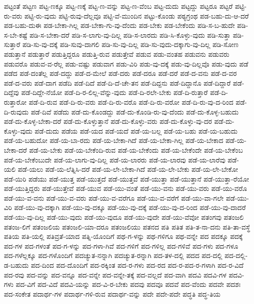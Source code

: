 {ಪಟ್ಟಂತೆ
ಪಟ್ಟಣ
ಪಟ್ಟ-ಣಕ್ಕೂ
ಪಟ್ಟ-ಣಕ್ಕೆ
ಪಟ್ಟ-ಣ-ವನ್ನು
ಪಟ್ಟ-ಣ-ವೆಂಬ
ಪಟ್ಟ-ದುದು
ಪಟ್ಟದ್ದು
ಪಟ್ಟರೂ
ಪಟ್ಟರೆ
ಪಟ್ಟಿ-ರು-ವರು
ಪಟ್ಟಿ-ರು-ವುದು
ಪಟ್ಟಿ-ರುವು-ದೆಲ್ಲವೂ
ಪಟ್ಟಿ-ವೆ-ಮುಂದಿನ
ಪಟ್ಟು-ಕೊಂಡು
ಪಠ್ಯಗ್ರಂಥ
ಪಡ-ಬಹು-ದು-ಆ-ದರೆ
ಪಡ-ಬಹು-ದುಈ
ಪಡ-ಬೇಕಾ-ಗಿಲ್ಲ
ಪಡ-ಬೇಕಾ-ಗು-ವು-ದೆಂದು
ಪಡ-ಬೇಕು
ಪಡ-ಬೇಕೆಂದು
ಪಡಿ-ಸ-ಬ-ಹುದೇ
ಪಡಿ-ಸ-ಬೇ-ಕಷ್ಟೆ
ಪಡಿ-ಸ-ಬೇಕಾ-ದರೆ
ಪಡಿ-ಸ-ಲಾಗು-ವು-ದಿಲ್ಲ
ಪಡಿ-ಸ-ಲಾರದು
ಪಡಿ-ಸಿ-ಕೊಳ್ಳು-ವುದು
ಪಡಿ-ಸುತ್ತಾ
ಪಡಿ-ಸುತ್ತಾರೆ
ಪಡಿ-ಸು-ವು-ದಕ್ಕೆ
ಪಡಿ-ಸುವು-ದಾಗಲಿ
ಪಡಿ-ಸು-ವು-ದಿಲ್ಲ
ಪಡಿ-ಸು-ವುದು-ದಕ್ಕಾಗು-ವು-ದಿಲ್ಲ
ಪಡಿ-ಸೋಣ
ಪಡುತ್ತಾನೆ
ಪಡುತ್ತಾರೆ
ಪಡುತ್ತಿದ್ದರೂ
ಪಡುತ್ತಿ-ರುವ
ಪಡುತ್ತೇವೆ
ಪಡುವ
ಪಡು-ವಂತಹ
ಪಡುವನು
ಪಡುವರು
ಪಡುವರೊ
ಪಡುವ-ವ-ರೆಲ್ಲ
ಪಡು-ವಷ್ಟು
ಪಡುವಾಗ
ಪಡು-ವಿರಿ
ಪಡು-ವು-ದಕ್ಕೆ
ಪಡು-ವು-ದಿಲ್ಲವೊ
ಪಡು-ವುದು
ಪಡೆ
ಪಡೆದ
ಪಡೆ-ದಂತೆಲ್ಲ
ಪಡೆ-ದದ್ದು
ಪಡೆ-ದ-ಮೇಲೆ
ಪಡೆ-ದರು
ಪಡೆ-ದರೂ
ಪಡೆ-ದರೆ
ಪಡೆ-ದ-ವನು
ಪಡೆ-ದ-ವರ
ಪಡೆ-ದ-ವರು
ಪಡೆ-ದಾಗ
ಪಡೆದಿ
ಪಡೆ-ದಿದೆ
ಪಡೆ-ದಿ-ದೆ-ಚೇ-ತನ
ಪಡೆ-ದಿದ್ದನು
ಪಡೆ-ದಿದ್ದಾನೊ
ಪಡೆ-ದಿದ್ದಾರೆ
ಪಡೆ-ದಿದ್ದೆವು
ಪಡೆ-ದಿದ್ದೇ-ನೆಯೋ
ಪಡೆ-ದಿ-ರ-ಲಿಲ್ಲ-ವೆನ್ನು-ವುದು
ಪಡೆ-ದಿ-ರಲೇ-ಬೇಕು
ಪಡೆ-ದಿ-ರುತ್ತಾರೆ
ಪಡೆ-ದಿ-ರುತ್ತಾರೋ
ಪಡೆ-ದಿ-ರುವ
ಪಡೆ-ದಿ-ರು-ವರು
ಪಡೆ-ದಿ-ರು-ವರೊ
ಪಡೆ-ದಿ-ರು-ವರೋ
ಪಡೆ-ದಿ-ರು-ವು-ದ-ರಿಂದ
ಪಡೆ-ದಿ-ರುವುದು
ಪಡೆ-ದಿವೆ
ಪಡೆದು
ಪಡೆ-ದು-ಕೊಂಡದ್ದು
ಪಡೆ-ದು-ಕೊಂಡಿ-ರು-ವು-ದೆಂದು
ಪಡೆ-ದು-ಕೊಳ್ಳ-ಬಹುದು
ಪಡೆ-ದು-ಕೊಳ್ಳ-ಬೇಕಾ-ದರೆ
ಪಡೆ-ದು-ಕೊಳ್ಳುತ್ತಾನೆ
ಪಡೆ-ದು-ಕೊಳ್ಳು-ವರು
ಪಡೆ-ದು-ಕೊಳ್ಳು-ವು-ದರ
ಪಡೆ-ದು-ಕೊಳ್ಳು-ವುದು
ಪಡೆ-ದುದು
ಪಡೆಯ
ಪಡೆ-ಯದ
ಪಡೆ-ಯದೆ
ಪಡೆ-ಯ-ಬಲ್ಲ
ಪಡೆ-ಯ-ಬಹು
ಪಡೆ-ಯ-ಬಹುದು
ಪಡೆ-ಯ-ಬಹುದೋ
ಪಡೆ-ಯ-ಬಾ-ರದು
ಪಡೆ-ಯ-ಬೇಕಾ-ಗಿದೆ
ಪಡೆ-ಯ-ಬೇಕಾ-ಗಿಲ್ಲ
ಪಡೆ-ಯ-ಬೇಕಾದ
ಪಡೆ-ಯ-ಬೇಕಾ-ದರೆ
ಪಡೆ-ಯ-ಬೇಕು
ಪಡೆ-ಯ-ಬೇಕೆಂದಿ-ರುವ
ಪಡೆ-ಯ-ಬೇಕೆಂದು
ಪಡೆ-ಯ-ಬೇಕೆಂದೇ
ಪಡೆ-ಯ-ಬೇಕೆಂಬ
ಪಡೆ-ಯ-ಬೇಕೆಂಬುದೇ
ಪಡೆ-ಯ-ಲಾಗು-ವು-ದಿಲ್ಲ
ಪಡೆ-ಯ-ಲಾರರು
ಪಡೆ-ಯ-ಲಾರವು
ಪಡೆ-ಯ-ಲಾರೆವು
ಪಡೆ-ಯಲಿ
ಪಡೆ-ಯಲು
ಪಡೆ-ಯ-ಲೆತ್ನಿಸಿ-ದರೆ
ಪಡೆ-ಯ-ಲೇ-ಬೇಕಾ-ಗಿದೆ
ಪಡೆ-ಯ-ಲೇ-ಬೇಕು
ಪಡೆ-ಯ-ಲೇ-ಬೇಕೋ
ಪಡೆ-ಯಿರಿ
ಪಡೆಯು
ಪಡೆ-ಯುತ್ತ
ಪಡೆ-ಯುತ್ತದೆ
ಪಡೆ-ಯುತ್ತವೆ
ಪಡೆ-ಯುತ್ತಾ
ಪಡೆ-ಯುತ್ತಾನೆ
ಪಡೆ-ಯುತ್ತಾ-ರೆಯೋ
ಪಡೆ-ಯುತ್ತಿದ್ದರು
ಪಡೆ-ಯುತ್ತೇವೆ
ಪಡೆ-ಯುವ
ಪಡೆ-ಯು-ವಂತೆ
ಪಡೆ-ಯು-ವನು
ಪಡೆ-ಯು-ವರು
ಪಡೆ-ಯು-ವರೊ
ಪಡೆ-ಯು-ವ-ವನು
ಪಡೆ-ಯು-ವ-ವರು
ಪಡೆ-ಯು-ವ-ವರೆಗೂ
ಪಡೆ-ಯು-ವ-ವರೆಗೆ
ಪಡೆ-ಯು-ವಾ-ಗಲೇ
ಪಡೆ-ಯು-ವಿರಿ
ಪಡೆ-ಯು-ವು-ದಕ್ಕಾಗಿ
ಪಡೆ-ಯು-ವು-ದಕ್ಕೂ
ಪಡೆ-ಯು-ವು-ದಕ್ಕೆ
ಪಡೆ-ಯು-ವು-ದ-ರಿಂದ
ಪಡೆ-ಯು-ವು-ದಾದರೆ
ಪಡೆ-ಯು-ವು-ದಿಲ್ಲ
ಪಡೆ-ಯು-ವುದು
ಪಡೆ-ಯು-ವುದೂ
ಪಡೆ-ಯು-ವುದೇ
ಪಡೆ-ಯು-ವೆವೋ
ಪತಂಗವು
ಪತಂಜಲಿ
ಪತಂಜ-ಲಿಗೆ
ಪತಂಜಲಿಯ
ಪತಂಜಲಿ-ಯಾ-ದರೂ
ಪತಂಜಲಿಯು
ಪತನದ
ಪತಿ
ಪತಿತ
ಪತಿ-ತ-ನಾ-ದನು
ಪತಿ-ತಾ-ವಸ್ಥೆ
ಪತಿಯ
ಪತಿ-ಯಲ್ಲಿ
ಪತಿವ್ರತೆ-ಯಾದ
ಪತ್ನಿ-ಯೊಂದಿಗೆ
ಪಥ-ಗ-ಳನ್ನು
ಪಥ-ಗಳಿಗೂ
ಪಥ-ವನ್ನೇ
ಪದ
ಪದಕ್ಕೂ
ಪದಕ್ಕೆ
ಪದ-ಗಳ
ಪದ-ಗಳಂತೆ
ಪದ-ಗ-ಳನ್ನು
ಪದ-ಗಳಾ-ಗಿವೆ
ಪದ-ಗಳಿಗೆ
ಪದ-ಗಳಿಲ್ಲ
ಪದ-ಗಳಿವೆ
ಪದ-ಗಳು
ಪದ-ಗಳೂ
ಪದ-ಗಳೆಲ್ಲಕ್ಕೂ
ಪದ-ಗಳೊಂದಿಗೆ
ಪದಚ್ಯುತ-ನನ್ನಾಗಿ
ಪದಚ್ಯುತ-ರನ್ನಾಗಿ
ಪದ-ತಳ-ದಲ್ಲಿ
ಪದದ
ಪದ-ದಲ್ಲಿ
ಪದ-ದಲ್ಲಿ-ಡ-ಬಹುದು
ಪದ-ದಿಂದ
ಪದ-ದೊಂದಿಗೆ
ಪದ-ರಕ್ಕಿಂತ
ಪದ-ರ-ಗಳು
ಪದ-ರದ
ಪದ-ರ-ಪದ-ರ-ಗಳಾಗಿ
ಪದ-ರ-ವಿದೆ
ಪದ-ರವು
ಪದ-ವನ್ನು
ಪದ-ವನ್ನೂ
ಪದ-ವನ್ನೇ
ಪದ-ವನ್ನೇ-ತಕ್ಕೆ
ಪದ-ವಲ್ಲದೆ
ಪದ-ವಾಗಿ
ಪದವಿ
ಪದವಿ-ಗಳ
ಪದವಿ-ಗಳು
ಪದ-ವಿಗೆ
ಪದ-ವಿದೆ
ಪದವಿ-ಯನ್ನು
ಪದ-ವಿ-ರ-ಬೇಕು
ಪದವು
ಪದವೂ
ಪದವೆ
ಪದ-ವೆಂದು
ಪದವೇ
ಪದಶಃ
ಪದ-ಸಂಕೇತ
ಪದಾರ್ಥ-ಗಳ
ಪದಾರ್ಥ-ಗಳಿ-ರುವ
ಪದಾರ್ಥ-ವನ್ನು
ಪದೇ
ಪದೇ-ಪದೇ
ಪದ್ಧತಿ
ಪದ್ಧ-ತಿಯ
}
